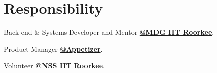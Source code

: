 \documentclass[letterpaper]{deedy-resume} %
\begin{document}
\begin{minipage}[t]{0.33\textwidth}

\section{Responsibility} 
\sectionspace %
\begin{tightitemize}
\item Back-end \& Systems Developer and Mentor \href{https://mdg.iitr.ac.in}{\bf @MDG IIT Roorkee}.
\item Product Manager \href{https://mess.iitr.ac.in}{\bf @Appetizer}.
\item Volunteer \href{https://nss.iitr.ac.in/}{\bf @NSS IIT Roorkee}.
\end{tightitemize}



\end{minipage} %
\hfill
%
%
\end{document}
